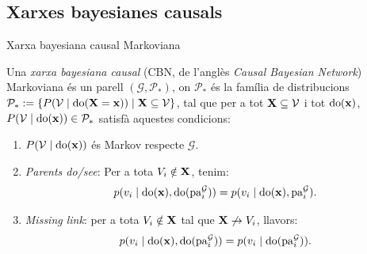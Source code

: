 \documentclass{bestbeamer}
\begin{document}
\subsection{Xarxes bayesianes causals}
\begin{frame}{Xarxa bayesiana causal Markoviana}\label{frame:CBN}
\begin{definition}\label{def:bayesiancausal}
Una \textit{xarxa bayesiana causal} (CBN, de l'anglès \textit{Causal Bayesian Network}) Markoviana és un parell $(\mathcal{G},\mathcal{P}_*)$, on $\mathcal{P}_*$ és la família de distribucions $\mathcal{P}_*:=\left\{ P(\mathcal{V}\mid \operatorname{do}(\mathbf{X}=\mathbf{x})) \mid \mathbf{X} \subseteq \mathcal{V}\right\}$, tal que per a tot $\mathbf{X}\subseteq\mathcal{V}$ i tot $\operatorname{do}(\mathbf{x})$, $P(\mathcal{V}\mid \operatorname{do}(\mathbf{x}))\in\mathcal{P}_*$ satisfà aquestes condicions:
\begin{enumerate}
  \item $P(\mathcal{V}\mid \operatorname{do}(\mathbf{x}))$ és Markov respecte $\mathcal{G}$.
  \item \textit{Parents do/see}: Per a tota $V_i\notin\mathbf{X}$, tenim:
  \begin{equation*}
  p(v_i\mid \operatorname{do}(\mathbf{x}),\operatorname{do}(\operatorname{pa}_i^{\mathcal{G}}))=p(v_i\mid \operatorname{do}(\mathbf{x}), \operatorname{pa}_i^{\mathcal{G}}).
  \end{equation*}
  \item \textit{Missing link}: per a tota $V_i\notin\mathbf{X}$ tal que $\mathbf{X}\not\rightarrow V_i$, llavors:
  \begin{equation*}
  p(v_i\mid \operatorname{do}(\mathbf{x}),\operatorname{do}(\operatorname{pa}_i^{\mathcal{G}}))=p(v_i\mid \operatorname{do}(\operatorname{pa}_i^{\mathcal{G}})).
  \end{equation*}
\end{enumerate}
\end{definition}
\vfill
\hfill{}
\end{frame}
\end{document}
